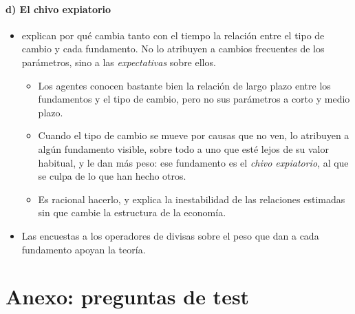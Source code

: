 \documentclass[11pt]{article}
\begin{document}
\paragraph{d) El chivo expiatorio}
\begin{itemize}
\item \textcite{BacchettaVanWincoop2004,BacchettaVanWincoop2013} explican por qué cambia tanto con el tiempo la relación entre el tipo de cambio y cada fundamento. No lo atribuyen a cambios frecuentes de los parámetros, sino a las \emph{expectativas} sobre ellos.
  \begin{itemize}
  \item Los agentes conocen bastante bien la relación de largo plazo entre los fundamentos y el tipo de cambio, pero no sus parámetros a corto y medio plazo.
  \item Cuando el tipo de cambio se mueve por causas que no ven, lo atribuyen a algún fundamento visible, sobre todo a uno que esté lejos de su valor habitual, y le dan más peso: ese fundamento es el \emph{chivo expiatorio}, al que se culpa de lo que han hecho otros.
  \item Es racional hacerlo, y explica la inestabilidad de las relaciones estimadas sin que cambie la estructura de la economía.
  \end{itemize}
\item Las encuestas a los operadores de divisas sobre el peso que dan a cada fundamento apoyan la teoría\nocite{FratzscherSarnoZinna2012}.
\end{itemize}

\section{Anexo: preguntas de test}\label{anexo:test}
\end{document}
